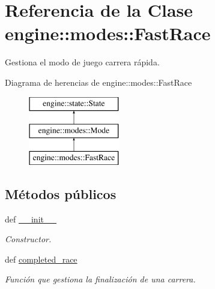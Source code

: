\hypertarget{classengine_1_1modes_1_1FastRace}{
\section{\-Referencia de la \-Clase engine\-:\-:modes\-:\-:\-Fast\-Race}
\label{classengine_1_1modes_1_1FastRace}
}


\-Gestiona el modo de juego carrera rápida.  


\-Diagrama de herencias de engine\-:\-:modes\-:\-:\-Fast\-Race\begin{figure}[H]
\begin{center}
\leavevmode
\includegraphics[height=3.000000cm]{classengine_1_1modes_1_1FastRace}
\end{center}
\end{figure}
\subsection*{\-Métodos públicos}
\begin{DoxyCompactItemize}
\item 
def \hyperlink{classengine_1_1modes_1_1FastRace_a295263a8888b12a4e2023f1849be4787}{\-\_\-\-\_\-init\-\_\-\-\_\-}
\begin{DoxyCompactList}\small\item\em \-Constructor. \end{DoxyCompactList}\item 
def \hyperlink{classengine_1_1modes_1_1FastRace_a3d3ede0a0e11469958f75b711f2a7a76}{completed\-\_\-race}
\begin{DoxyCompactList}\small\item\em \-Función que gestiona la finalización de una carrera. \end{DoxyCompactList}\end{DoxyCompactItemize}
